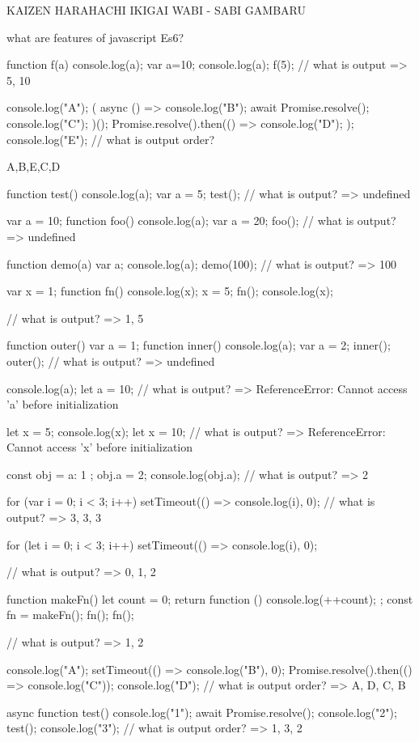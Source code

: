 KAIZEN
HARAHACHI
IKIGAI
WABI - SABI
GAMBARU

what are features of javascript Es6?

function f(a){
    console.log(a);
    var a=10;
    console.log(a);
}
f(5);
// what is output =>  5, 10

console.log("A");
( async () => {
    console.log("B");
    await Promise.resolve();
    console.log("C");
})();
Promise.resolve().then(() => {
    console.log("D");
});
console.log("E");
// what is output order?

A,B,E,C,D

function test() {
  console.log(a);
  var a = 5;
}
test();
// what is output? => undefined

var a = 10;
function foo() {
  console.log(a);
  var a = 20;
}
foo();
// what is output? => undefined


function demo(a) {
  var a;
  console.log(a);
}
demo(100);
// what is output? => 100

var x = 1;
function fn() {
  console.log(x);
  x = 5;
}
fn();
console.log(x);

// what is output? => 1, 5

function outer() {
  var a = 1;
  function inner() {
    console.log(a);
    var a = 2;
  }
  inner();
}
outer();
// what is output? => undefined

console.log(a);
let a = 10;
// what is output? => ReferenceError: Cannot access 'a' before initialization

let x = 5;
{
  console.log(x);
  let x = 10;
}
// what is output? => ReferenceError: Cannot access 'x' before initialization

const obj = { a: 1 };
obj.a = 2;
console.log(obj.a);
// what is output? => 2

for (var i = 0; i < 3; i++) {
  setTimeout(() => console.log(i), 0);
}
// what is output? => 3, 3, 3

for (let i = 0; i < 3; i++) {
  setTimeout(() => console.log(i), 0);
}

// what is output? => 0, 1, 2

function makeFn() {
  let count = 0;
  return function () {
    console.log(++count);
  };
}
const fn = makeFn();
fn();
fn();

// what is output? => 1, 2

console.log("A");
setTimeout(() => console.log("B"), 0);
Promise.resolve().then(() => console.log("C"));
console.log("D");
// what is output order? => A, D, C, B

async function test() {
  console.log("1");
  await Promise.resolve();
  console.log("2");
}
test();
console.log("3");
// what is output order? => 1, 3, 2

